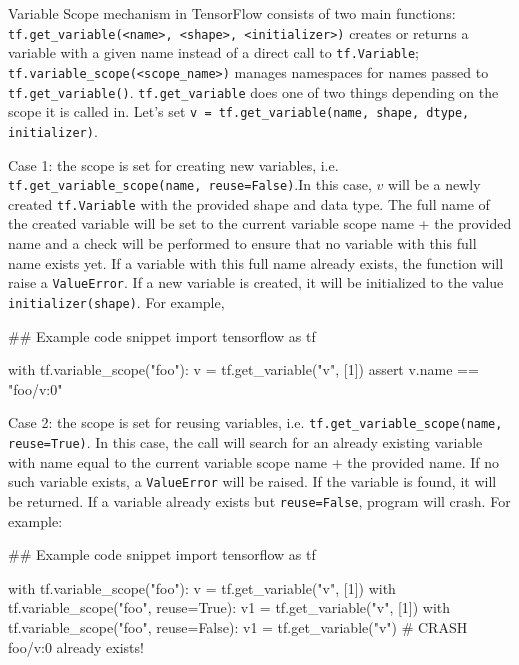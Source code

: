 \documentclass{tufte-handout}
\begin{document}
Variable Scope mechanism in TensorFlow consists of two main functions: \texttt{tf.get\_variable(<name>, <shape>, <initializer>)} creates or returns a variable with a given name instead of a direct call to \texttt{tf.Variable}; \texttt{tf.variable\_scope(<scope\_name>)} manages namespaces for names passed to \texttt{tf.get\_variable()}. \texttt{tf.get\_variable} does one of two things depending on the scope it is called in. Let's set \texttt{v = tf.get\_variable(name, shape, dtype, initializer)}. 

Case 1: the scope is set for creating new variables, i.e. \texttt{tf.get\_variable\_scope(name, reuse=False)}.In this case, $v$ will be a newly created \texttt{tf.Variable} with the provided shape and data type. The full name of the created variable will be set to the current variable scope name + the provided name and a check will be performed to ensure that no variable with this full name exists yet. If a variable with this full name already exists, the function will raise a \texttt{ValueError}. If a new variable is created, it will be initialized to the value \texttt{initializer(shape)}. For example, 

\begin{python}
## Example code snippet
import tensorflow as tf

with tf.variable_scope("foo"):
    v = tf.get_variable("v", [1])
assert v.name == "foo/v:0"
\end{python}

Case 2: the scope is set for reusing variables, i.e. \texttt{tf.get\_variable\_scope(name, reuse=True)}. In this case, the call will search for an already existing variable with name equal to the current variable scope name + the provided name. If no such variable exists, a \texttt{ValueError} will be raised. If the variable is found, it will be returned. If a variable already exists but \texttt{reuse=False}, program will crash. For example:

\begin{python}
## Example code snippet
import tensorflow as tf

with tf.variable_scope("foo"):
    v = tf.get_variable("v", [1])
with tf.variable_scope("foo", reuse=True):
    v1 = tf.get_variable("v", [1])
with tf.variable_scope("foo", reuse=False):
	v1 = tf.get_variable("v") 	   # CRASH foo/v:0 already exists!
\end{python}
\end{document}
